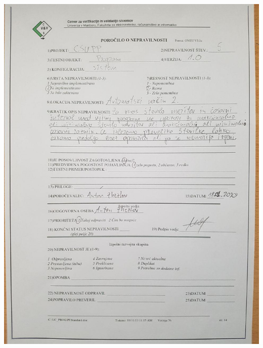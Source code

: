 \documentclass[a4paper,12pt]{article}
\begin{document}
{	\includegraphics[width=15cm]{porocila/05.jpg}
	
\newpage
	
	\hspace{2cm}

	\vspace{2cm}
	
}
\end{document}
